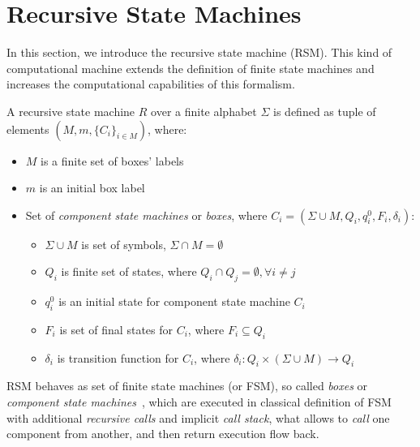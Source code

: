 \section{Recursive State Machines}

In this section, we introduce the recursive state machine (RSM). This kind of computational machine extends the definition of finite state machines and increases the computational capabilities of this formalism.

A recursive state machine $R$ over a finite alphabet $\Sigma$ is defined as tuple of elements $(M,m,\{C_i\}_{i \in M})$, where:

\begin{itemize}
    \item $M$ is a finite set of boxes' labels
    \item $m$ is an initial box label
    \item Set of \textit{component state machines} or \textit{boxes}, 
          where $C_i=(\Sigma \cup M, Q_i,q_i^0,F_i,\delta_i)$:
    \begin{itemize}
        \item $\Sigma \cup M$ is set of symbols, $\Sigma \cap M = \emptyset$
        \item $Q_i$ is finite set of states, 
              where $Q_i \cap Q_j = \emptyset, \forall i \neq j$
        \item $q_i^0$ is an initial state for component state machine $C_i$
        \item $F_i$ is set of final states for $C_i$, where $F_i \subseteq Q_i$
        \item $\delta_i$ is transition function for $C_i$, 
              where $\delta_i: Q_i \times (\Sigma \cup M) 
              \to Q_i$
    \end{itemize}
\end{itemize}

RSM behaves as set of finite state machines (or FSM), so called \textit{boxes} or \textit{component state machines}~\cite{rsm:analysis:10.1007/3-540-44585-4_18}, which are executed in classical definition of FSM with additional \textit{recursive calls} and implicit \textit{call stack}, what allows to \textit{call} one component from another, and then return execution flow back.



